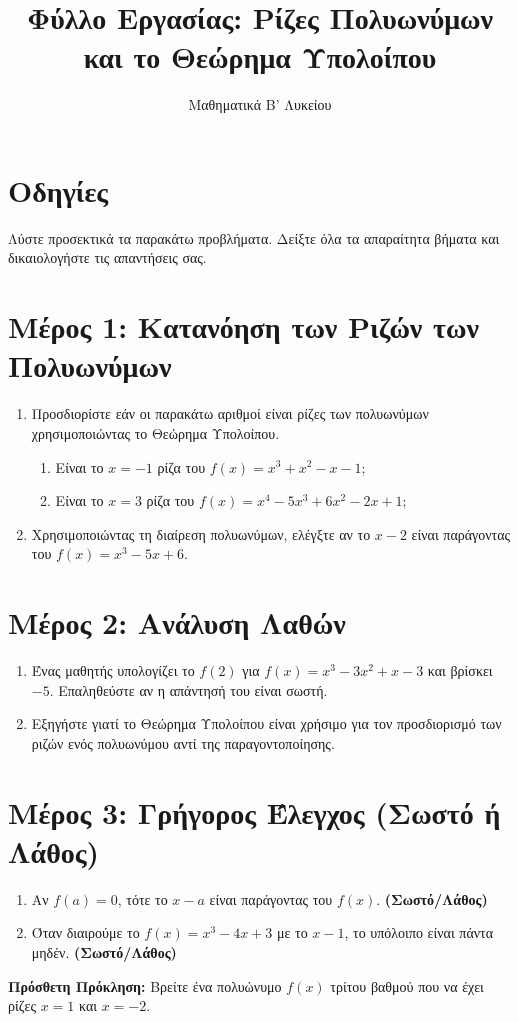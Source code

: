 \documentclass[a4paper,12pt,greek]{article}
\title{\textbf{Φύλλο Εργασίας: Ρίζες Πολυωνύμων \\ και το Θεώρημα Υπολοίπου}}
\author{Μαθηματικά Β' Λυκείου}
\date{}
\begin{document}
\maketitle

\section*{Οδηγίες}
Λύστε προσεκτικά τα παρακάτω προβλήματα. Δείξτε όλα τα απαραίτητα βήματα και δικαιολογήστε τις απαντήσεις σας.

\section*{Μέρος 1: Κατανόηση των Ριζών των Πολυωνύμων}
\begin{enumerate}
  \item Προσδιορίστε εάν οι παρακάτω αριθμοί είναι ρίζες των πολυωνύμων χρησιμοποιώντας το Θεώρημα Υπολοίπου.
        \begin{enumerate}
          \item Είναι το $x = -1$ ρίζα του $f(x) = x^3 + x^2 - x - 1$;
          \item Είναι το $x = 3$ ρίζα του $f(x) = x^4 - 5x^3 + 6x^2 - 2x + 1$;
        \end{enumerate}
  \item Χρησιμοποιώντας τη διαίρεση πολυωνύμων, ελέγξτε αν το $x - 2$ είναι παράγοντας του $f(x) = x^3 - 5x + 6$.
\end{enumerate}

\section*{Μέρος 2: Ανάλυση Λαθών}
\begin{enumerate}
  \item Ένας μαθητής υπολογίζει το $f(2)$ για $f(x) = x^3 - 3x^2 + x - 3$ και βρίσκει $-5$. Επαληθεύστε αν η απάντησή του είναι σωστή.
  \item Εξηγήστε γιατί το Θεώρημα Υπολοίπου είναι χρήσιμο για τον προσδιορισμό των ριζών ενός πολυωνύμου αντί της παραγοντοποίησης.
\end{enumerate}

\section*{Μέρος 3: Γρήγορος Έλεγχος (Σωστό ή Λάθος)}
\begin{enumerate}
  \item Αν $f(a) = 0$, τότε το $x-a$ είναι παράγοντας του $f(x)$. \textbf{(Σωστό/Λάθος)}
  \item Όταν διαιρούμε το $f(x) = x^3 - 4x + 3$ με το $x - 1$, το υπόλοιπο είναι πάντα μηδέν. \textbf{(Σωστό/Λάθος)}
\end{enumerate}

\vfill
\textbf{Πρόσθετη Πρόκληση:} Βρείτε ένα πολυώνυμο $f(x)$ τρίτου βαθμού που να έχει ρίζες $x = 1$ και $x = -2$.
\end{document}

